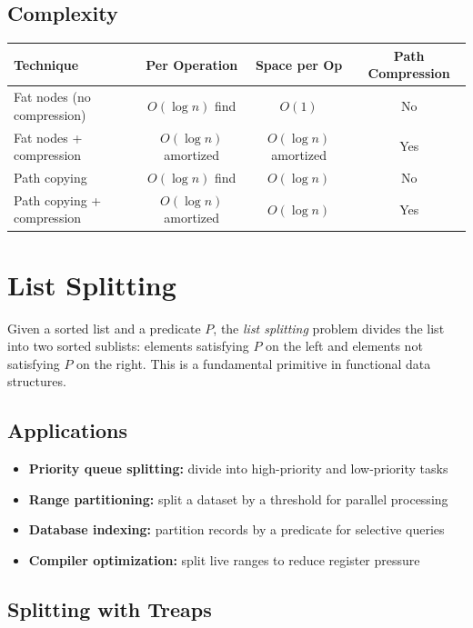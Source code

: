 \subsection{Complexity}

\begin{center}
\begin{tabular}{lccc}
\toprule
Technique & Per Operation & Space per Op & Path Compression \\
\midrule
Fat nodes (no compression) & $O(\log n)$ find & $O(1)$ & No \\
Fat nodes + compression & $O(\log n)$ amortized & $O(\log n)$ amortized & Yes \\
Path copying & $O(\log n)$ find & $O(\log n)$ & No \\
Path copying + compression & $O(\log n)$ amortized & $O(\log n)$ & Yes \\
\bottomrule
\end{tabular}
\end{center}

\section{List Splitting}
\label{sec:list-splitting}

Given a sorted list and a predicate $P$, the \emph{list splitting} problem divides the list into two sorted sublists: elements satisfying $P$ on the left and elements not satisfying $P$ on the right. This is a fundamental primitive in functional data structures.

\subsection{Applications}

\begin{itemize}
    \item \textbf{Priority queue splitting:} divide into high-priority and low-priority tasks
    \item \textbf{Range partitioning:} split a dataset by a threshold for parallel processing
    \item \textbf{Database indexing:} partition records by a predicate for selective queries
    \item \textbf{Compiler optimization:} split live ranges to reduce register pressure
\end{itemize}

\subsection{Splitting with Treaps}

